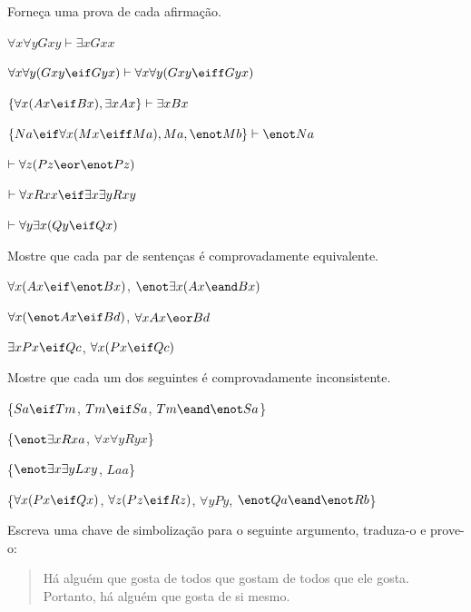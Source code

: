 \problempart
Forneça uma prova de cada afirmação.
\begin{earg}
\item $\forall x \forall y Gxy\vdash\exists x Gxx$
\item $\forall x \forall y (Gxy \eif Gyx) \vdash \forall x\forall y (Gxy \eiff Gyx)$
\item $\{\forall x(Ax\eif Bx), \exists x Ax\} \vdash \exists x Bx$
\item $\{Na \eif \forall x(Mx \eiff Ma), Ma, \enot Mb\}\vdash \enot Na$
\item $\vdash\forall z (Pz \eor \enot Pz)$
\item $\vdash\forall x Rxx\eif \exists x \exists y Rxy$
\item $\vdash\forall y \exists x (Qy \eif Qx)$
\end{earg}



\problempart
Mostre que cada par de sentenças é comprovadamente equivalente.
\begin{earg}
\item $\forall x (Ax\eif \enot Bx)$, $\enot\exists x(Ax \eand Bx)$
\item $\forall x (\enot Ax\eif Bd)$, $\forall x Ax \eor Bd$
\item $\exists x Px \eif Qc$, $\forall x (Px \eif Qc)$
\end{earg}



\problempart
Mostre que cada um dos seguintes é comprovadamente inconsistente.
\begin{earg}
\item \{$Sa\eif Tm$, $Tm \eif Sa$, $Tm \eand \enot Sa$\}
\item \{$\enot\exists x Rxa$, $\forall x \forall y Ryx$\}
\item \{$\enot\exists x \exists y Lxy$, $Laa$\}
\item \{$\forall x(Px \eif Qx)$, $\forall z(Pz \eif Rz)$, $\forall y Py$, $\enot Qa \eand \enot Rb$\}
\end{earg}



\solutions
\problempart
\label{pr.likes}
Escreva uma chave de simbolização para o seguinte argumento, traduza-o e prove-o:
\begin{quote}
Há alguém que gosta de todos que gostam de todos que ele gosta. Portanto, há alguém que gosta de si mesmo.
\end{quote}

